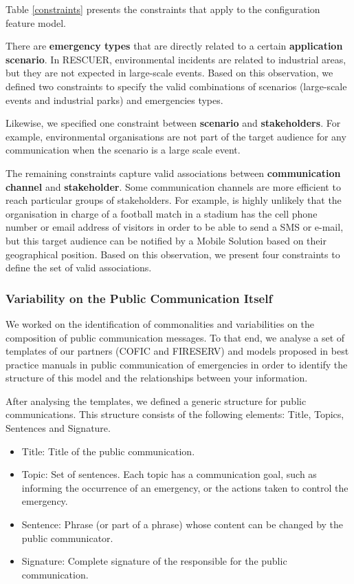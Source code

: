 Table \ref{constraints} presents the constraints that apply to the configuration feature model.

There are \textbf{emergency types} that are directly related to a certain \textbf{application scenario}. In RESCUER, environmental incidents are related to industrial areas, but they are not expected in large-scale events. Based on this observation, we defined two constraints to specify the valid combinations of scenarios (large-scale events and industrial parks) and emergencies types.

Likewise, we specified one constraint between \textbf{scenario} and \textbf{stakeholders}. For example, environmental organisations are not part of the target audience for any communication when the scenario is a large scale event.

The remaining constraints capture valid associations between \textbf{communication channel} and \textbf{stakeholder}. Some communication channels are more efficient to reach particular groups of stakeholders. For example, is highly unlikely that the organisation in charge of a football match in a stadium has the cell phone number or email address of visitors in order to be able to send a SMS or e-mail, but this target audience can be notified by a Mobile Solution based on their geographical position. Based on this observation, we present four constraints to define the set of valid associations.



\subsubsection{Variability on the Public Communication Itself}

We worked on the identification of commonalities and variabilities on the composition of public communication messages. To that end, we analyse a set of templates of our partners (COFIC and FIRESERV) and models proposed in best practice manuals \citep{cisvGuide} \citep{certTemplates} \citep{panamericanhealthorganization2009} in public communication of emergencies in order to identify the structure of this model and the relationships between your information. 

After analysing the templates, we defined a generic structure for public communications. This structure consists of the following elements: Title, Topics, Sentences and Signature.

\begin{itemize}
   \item Title: Title of the public communication.
   \item Topic: Set of sentences. Each topic has a communication goal, such as informing the occurrence of an emergency, or the actions taken to control the emergency.
   \item Sentence: Phrase (or part of a phrase) whose content can be changed by the public communicator. 
   \item Signature: Complete signature of the responsible for the public communication.

 \end{itemize}
 
